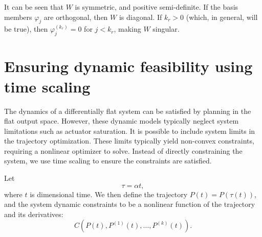It can be seen that $W$ is symmetric, and positive semi-definite.
If the basis members $\varphi_j$ are orthogonal, then ${W}$ is diagonal. 
If $k_r > 0$ (which, in general, will be true), then $\varphi_j^{(k_r)} = 0$ for $j < k_r$, making ${W}$ singular.





\section{Ensuring dynamic feasibility using time scaling}
The dynamics of a differentially flat system can be satisfied by planning in the flat output space. 
However, these dynamic models typically neglect system limitations such as actuator saturation. 
It is possible to include system limits in the trajectory optimization. 
These limits typically yield non-convex constraints, requiring a nonlinear optimizer to solve.
Instead of directly constraining the system, we use time scaling to ensure the constraints are satisfied.

Let 
\begin{equation}
\tau = \alpha t, 
\end{equation}
where $t$ is dimensional time. 
We then define the trajectory $P(t) = P(\tau(t))$, and the system dynamic constraints to be a nonlinear function of the trajectory and its derivatives:
\begin{equation}
	C(P(t), P^{(1)}(t), \dots, P^{(k)}(t)).
\end{equation}

